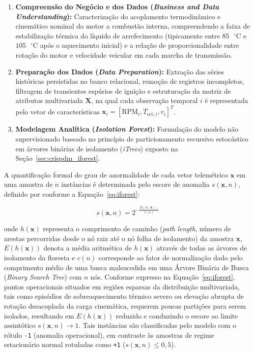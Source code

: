 \documentclass[
	12pt,				%
	openright,			%
	twoside,			%
	a4paper,			%
	english,			%
	brazil				%
	]{abntex2}
\begin{document}
\begin{enumerate}
    \item \textbf{Compreensão do Negócio e dos Dados (\textit{Business and Data
        Understanding}):} Caracterização do acoplamento termodinâmico e cinemático
        nominal do motor a combustão interna, compreendendo a faixa de estabilização
        térmica do líquido de arrefecimento (tipicamente entre
        $85\text{ }^{\circ}\text{C}$ e $105\text{ }^{\circ}\text{C}$ após o aquecimento
        inicial) e a relação de proporcionalidade entre rotação do motor e velocidade
        veicular em cada marcha de transmissão.
    \item \textbf{Preparação dos Dados (\textit{Data Preparation}):} Extração das séries
        históricas persistidas no banco relacional, remoção de registros incompletos,
        filtragem de transientes espúrios de ignição e estruturação da matriz de
        atributos multivariada $\mathbf{X}$, na qual cada observação temporal $i$ é
        representada pelo vetor de características
        $\mathbf{x}_i = [\text{RPM}_i, T_{\text{ect},i}, v_i]^T$.
    \item \textbf{Modelagem Analítica (\textit{Isolation Forest}):} Formulação do modelo
        não supervisionado baseado no princípio de particionamento recursivo estocástico
        em árvores binárias de isolamento (\textit{iTrees}) exposto na
        Seção~\ref{sec:crispdm_iforest}.
\end{enumerate}

A quantificação formal do grau de anormalidade de cada vetor telemétrico $\mathbf{x}$ em
uma amostra de $n$ instâncias é determinada pelo escore de anomalia $s(\mathbf{x}, n)$,
definido por  conforme a Equação~\eqref{eq:iforest}:

\begin{equation}\label{eq:iforest}
s(\mathbf{x}, n) = 2^{-\frac{E(h(\mathbf{x}))}{c(n)}}
\end{equation}

\noindent onde $h(\mathbf{x})$ representa o comprimento de caminho
(\textit{path length}, número de arestas percorridas desde o nó raiz até o nó folha de
isolamento) da amostra $\mathbf{x}$, $E(h(\mathbf{x}))$ denota a média aritmética de
$h(\mathbf{x})$ através de todas as árvores de isolamento da floresta e $c(n)$
corresponde ao fator de normalização dado pelo comprimento médio de uma busca
malsucedida em uma Árvore Binária de Busca (\textit{Binary Search Tree}) com $n$ nós.
Conforme expresso na Equação~\eqref{eq:iforest}, pontos operacionais situados em regiões
esparsas da distribuição multivariada, tais como episódios de sobreaquecimento térmico
severo ou elevação abrupta de rotação desacoplada da carga cinemática, requerem poucas
partições para serem isolados, resultando em $E(h(\mathbf{x}))$ reduzido e conduzindo o
escore ao limite assintótico $s(\mathbf{x}, n) \to 1$. Tais instâncias são classificadas
pelo modelo com o rótulo \texttt{-1} (anomalia operacional), em contraste às amostras de
regime estacionário normal rotuladas como \texttt{+1} ($s(\mathbf{x}, n) \le 0{,}5$).
\end{document}
